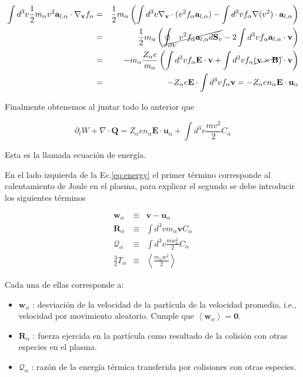 \begin{eqnarray}
  \int d^3v \frac{1}{2}m_\alpha v^2\textbf{a}_{l,\alpha}\cdot \nabla_\textbf{v}f_\alpha&=& \frac{1}{2}m_\alpha \left(\int d^3v \nabla_\textbf{v}\cdot(v^2f_\alpha\textbf{a}_{l,\alpha}) - \int d^3v f_\alpha \nabla(v^2) \cdot \textbf{a}_{l,\alpha}\right)\nonumber\\
  &=& \frac{1}{2}m_\alpha\left(\cancel{\oint_{\partial V}v^2f_\alpha \textbf{a}_{l,\alpha}d\textbf{S}_v} - 2\int d^3v f_\alpha \textbf{a}_{l,\alpha}\cdot\textbf{v}\right) \nonumber\\
  &=& -m_\alpha\frac{Z_\alpha e}{m_\alpha}\left(\int d^3v f_\alpha \textbf{E}\cdot\textbf{v} + \int d^3v f_\alpha \cancel{(\textbf{v}\times\textbf{B})}\cdot\textbf{v}\right)\nonumber\\
  &=& -Z_\alpha e\textbf{E}\cdot\int d^3v f_\alpha \textbf{v} = -Z_\alpha en_\alpha\textbf{E}\cdot\textbf{u}_\alpha 
\end{eqnarray}

Finalmente obtenemos al juntar todo lo anterior que 

\begin{equation}\label{eq:energy}
  \partial_t W + \nabla\cdot\textbf{Q} = Z_\alpha en_\alpha\textbf{E}\cdot\textbf{u}_\alpha + \int d^3v\frac{mv^2}{2}C_\alpha
\end{equation}

Esta es la llamada ecuaci\'on de energ\'ia.

En el lado izquierda de la Ec.\eqref{eq:energy} el primer t\'ermino corresponde al calentamiento de Joule en el plasma, para explicar el segundo se debe introducir los siguientes t\'erminos

  \begin{eqnarray}
    \textbf{w}_\alpha &\equiv& \textbf{v} - \textbf{u}_\alpha \nonumber\\
    \textbf{R}_\alpha &\equiv& \int d^3v m_\alpha\textbf{v}C_\alpha \nonumber\\
    \mathcal{Q}_\alpha &\equiv& \int d^3v \frac{mw_\alpha^2}{2}C_\alpha \nonumber\\
    \frac{3}{2}T_\alpha &\equiv& \left<\frac{m_\alpha w^2}{2}\right> \label{eq:temp}
  \end{eqnarray}

  Cada una de ellas corresponde a:
  \begin{itemize}
    \item $\textbf{w}_\alpha$ : desviaci\'on de la velocidad de la part\'icula de la velocidad promedio, i.e., velocidad por movimiento aleatorio. Cumple que $\left<\textbf{w}_\alpha\right> = \textbf{0}$.
    \item $\textbf{R}_\alpha$ : fuerza ejercida en la part\'icula como resultado de la colisi\'on con otras especies en el plasma.
    \item $\mathcal{Q}_\alpha$ : raz\'on de la energ\'ia t\'ermica transferida por colisiones con otras especies. 
  \end{itemize}

